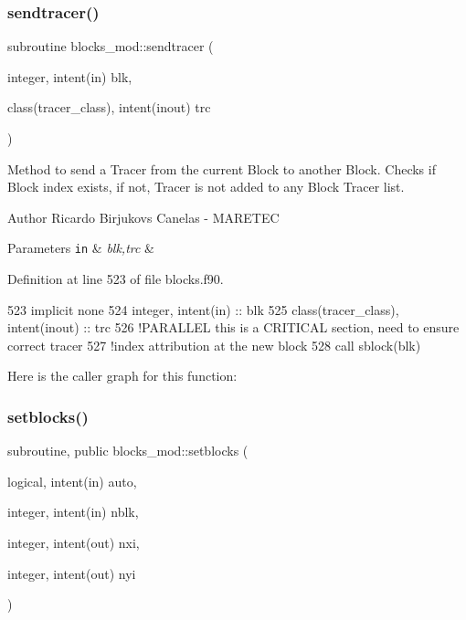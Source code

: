\subsubsection{\texorpdfstring{sendtracer()}{sendtracer()}}
{\footnotesize\ttfamily subroutine blocks\+\_\+mod\+::sendtracer (\begin{DoxyParamCaption}\item[{integer, intent(in)}]{blk,  }\item[{class(tracer\+\_\+class), intent(inout)}]{trc }\end{DoxyParamCaption})\hspace{0.3cm}{\ttfamily [private]}}



Method to send a Tracer from the current Block to another Block. Checks if Block index exists, if not, Tracer is not added to any Block Tracer list. 

\begin{DoxyAuthor}{Author}
Ricardo Birjukovs Canelas -\/ M\+A\+R\+E\+T\+EC 
\end{DoxyAuthor}

\begin{DoxyParams}[1]{Parameters}
\mbox{\tt in}  & {\em blk,trc} & \\
\hline
\end{DoxyParams}


Definition at line 523 of file blocks.\+f90.


\begin{DoxyCode}
523     \textcolor{keywordtype}{implicit none}
524     \textcolor{keywordtype}{integer}, \textcolor{keywordtype}{intent(in)} :: blk
525     \textcolor{keywordtype}{class}(tracer\_class), \textcolor{keywordtype}{intent(inout)} :: trc
526     \textcolor{comment}{!PARALLEL this is a CRITICAL section, need to ensure correct tracer}
527     \textcolor{comment}{!index attribution at the new block}
528     \textcolor{keyword}{call }sblock(blk)%
\end{DoxyCode}
Here is the caller graph for this function\+:
\mbox{\label{namespaceblocks__mod_a8f5a5d9e6cfd16cfd1b179092a204696}} 
\subsubsection{\texorpdfstring{setblocks()}{setblocks()}}
{\footnotesize\ttfamily subroutine, public blocks\+\_\+mod\+::setblocks (\begin{DoxyParamCaption}\item[{logical, intent(in)}]{auto,  }\item[{integer, intent(in)}]{nblk,  }\item[{integer, intent(out)}]{nxi,  }\item[{integer, intent(out)}]{nyi }\end{DoxyParamCaption})}



